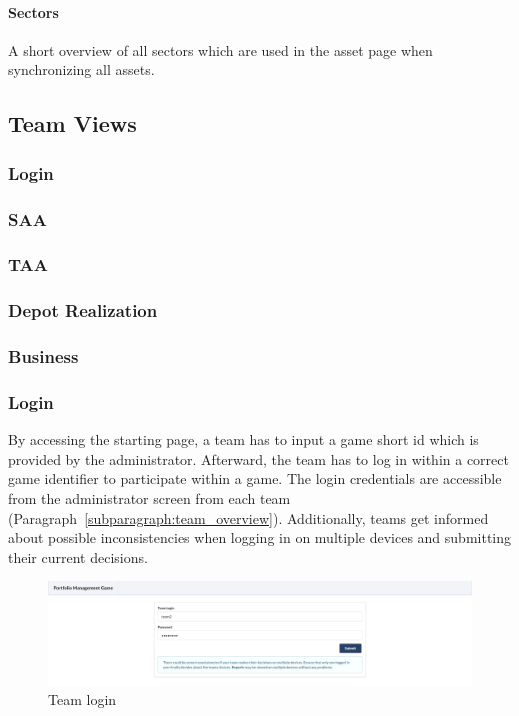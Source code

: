 \paragraph{Sectors}
A short overview of all sectors which are used in the asset page when synchronizing all assets.


\subsection{Team Views}

\subsubsection{Login}

\subsubsection{SAA}

\subsubsection{TAA}

\subsubsection{Depot Realization}

\subsubsection{Business}

\subsubsection{Login}
By accessing the starting page, a team has to input a game short id which is provided by the administrator. Afterward, the team has to log in within a correct game identifier to participate within a game. The login credentials are accessible from the administrator screen from each team (Paragraph~\ref{subparagraph:team_overview}). Additionally, teams get informed about possible inconsistencies when logging in on multiple devices and submitting their current decisions.
\begin{figure}[h!]
  \centering
  \includegraphics[scale=0.2]{img/application-overview/teams/01_login.png}
  \caption{Team login}
\end{figure}

